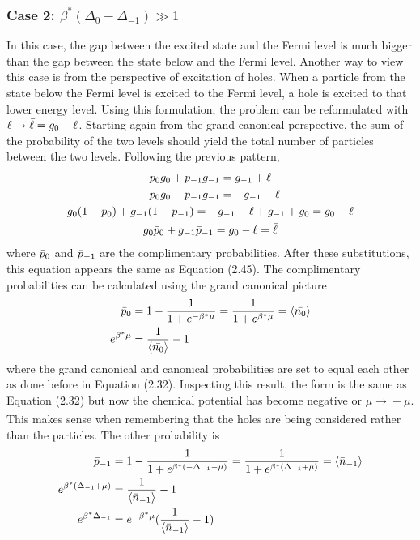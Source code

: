 \subsubsection{Case 2: $\beta^*(\Delta_0-\Delta_{-1})\gg 1$}
In this case, the gap between the excited state and the Fermi level is much bigger
than the gap between the state below and the Fermi level. Another way to view this case is from the perspective of excitation of holes. When a particle from the state below the Fermi level is excited to the Fermi level, a hole is excited to that lower energy level. Using this formulation, the problem can be reformulated with $\ell \xrightarrow[]{} \Bar{\ell}=g_0-\ell$. Starting again from the grand canonical perspective, the sum of the probability of the two levels should yield the total number of particles between the two levels. Following the previous pattern,
\begin{gather}
    p_0g_0+p_{-1}g_{-1}=g_{-1}+\ell\nonumber\\
    -p_0g_0-p_{-1}g_{-1}=-g_{-1}-\ell\nonumber\\
    g_0(1-p_0)+g_{-1}(1-p_{-1})=-g_{-1}-\ell+g_{-1}+g_0=g_0-\ell\nonumber\\
    g_0\Bar{p}_0+g_{-1}\Bar{p}_{-1}=g_0-\ell=\Bar{\ell}
\end{gather}
where $\Bar{p}_0$ and $\Bar{p}_{-1}$ are the complimentary probabilities. After these substitutions, this equation appears the same as Equation (2.45). The complimentary probabilities can be calculated using the grand canonical picture 
\begin{align}
    \Bar{p}_0&=1-\frac{1}{1+e^{-\beta^*\mu}}=\frac{1}{1+e^{\beta^*\mu}}=\left<{\Bar{n_0}}\right>\\
    e^{\beta^*\mu}&=\frac{1}{\left<{\Bar{n_0}}\right>}-1
\end{align}
where the grand canonical and canonical probabilities are set to equal each other as done before in Equation (2.32). Inspecting this result, the form is the same as Equation (2.32) but now the chemical potential has become negative or $\mu\xrightarrow[]{}-\mu$. This makes sense when remembering that the holes are being considered rather than the particles. The other probability is 
\begin{align}
    \Bar{p}_{-1}&=1-\frac{1}{1+e^{\beta^*(-\Delta_{-1}-\mu)}}=\frac{1}{1+e^{\beta^*(\Delta_{-1}+\mu)}}=\left<{\Bar{n}_{-1}}\right>\\
    e^{\beta^*(\Delta_{-1}+\mu)}&=\frac{1}{\left<{\Bar{n}_{-1}}\right>}-1\nonumber\\
    e^{\beta^*\Delta_{-1}}&=e^{-\beta^*\mu}(\frac{1}{\left<{\Bar{n}_{-1}}\right>}-1)
\end{align}

